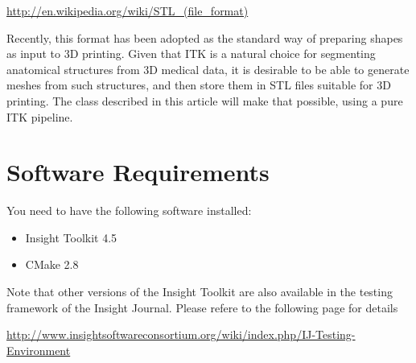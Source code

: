 \documentclass{InsightArticle}
\begin{document}
\url{http://en.wikipedia.org/wiki/STL_(file_format)}

Recently, this format has been adopted as the standard way of preparing shapes
as input to 3D printing. Given that ITK is a natural choice for segmenting
anatomical structures from 3D medical data, it is desirable to be able to
generate meshes from such structures, and then store them in STL files suitable
for 3D printing. The class described in this article will make that possible,
using a pure ITK pipeline.


\section{Software Requirements}

You need to have the following software installed:

\begin{itemize}
  \item  Insight Toolkit 4.5
  \item  CMake 2.8
\end{itemize}

Note that other versions of the Insight Toolkit are also available in the
testing framework of the Insight Journal. Please refere to the following page
for details

\url{http://www.insightsoftwareconsortium.org/wiki/index.php/IJ-Testing-Environment}


%
%



\end{document}
